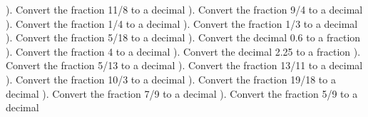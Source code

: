 \documentclass{article}%
\begin{document}
). Convert the fraction 11/8 to a decimal%
\newline%
\newline%
). Convert the fraction 9/4 to a decimal%
\newline%
\newline%
). Convert the fraction 1/4 to a decimal%
\newline%
\newline%
). Convert the fraction 1/3 to a decimal%
\newline%
\newline%
). Convert the fraction 5/18 to a decimal%
\newline%
\newline%
). Convert the decimal 0.6 to a fraction%
\newline%
\newline%
). Convert the fraction 4 to a decimal%
\newline%
\newline%
). Convert the decimal 2.25 to a fraction%
\newline%
\newline%
). Convert the fraction 5/13 to a decimal%
\newline%
\newline%
). Convert the fraction 13/11 to a decimal%
\newline%
\newline%
). Convert the fraction 10/3 to a decimal%
\newline%
\newline%
). Convert the fraction 19/18 to a decimal%
\newline%
\newline%
). Convert the fraction 7/9 to a decimal%
\newline%
\newline%
). Convert the fraction 5/9 to a decimal%
\end{document}

